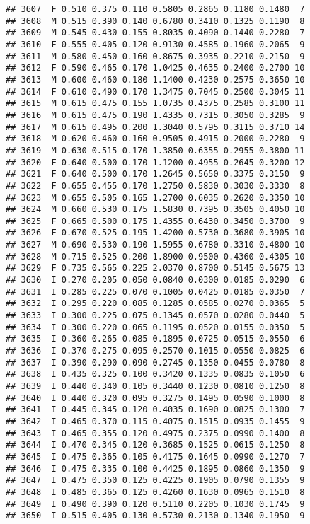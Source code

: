 \documentclass[
]{article}
\begin{document}
\begin{verbatim}
## 3607  F 0.510 0.375 0.110 0.5805 0.2865 0.1180 0.1480  7
## 3608  M 0.515 0.390 0.140 0.6780 0.3410 0.1325 0.1190  8
## 3609  M 0.545 0.430 0.155 0.8035 0.4090 0.1440 0.2280  7
## 3610  F 0.555 0.405 0.120 0.9130 0.4585 0.1960 0.2065  9
## 3611  M 0.580 0.450 0.160 0.8675 0.3935 0.2210 0.2150  9
## 3612  F 0.590 0.465 0.170 1.0425 0.4635 0.2400 0.2700 10
## 3613  M 0.600 0.460 0.180 1.1400 0.4230 0.2575 0.3650 10
## 3614  F 0.610 0.490 0.170 1.3475 0.7045 0.2500 0.3045 11
## 3615  M 0.615 0.475 0.155 1.0735 0.4375 0.2585 0.3100 11
## 3616  M 0.615 0.475 0.190 1.4335 0.7315 0.3050 0.3285  9
## 3617  M 0.615 0.495 0.200 1.3040 0.5795 0.3115 0.3710 14
## 3618  M 0.620 0.460 0.160 0.9505 0.4915 0.2000 0.2280  9
## 3619  M 0.630 0.515 0.170 1.3850 0.6355 0.2955 0.3800 11
## 3620  F 0.640 0.500 0.170 1.1200 0.4955 0.2645 0.3200 12
## 3621  F 0.640 0.500 0.170 1.2645 0.5650 0.3375 0.3150  9
## 3622  F 0.655 0.455 0.170 1.2750 0.5830 0.3030 0.3330  8
## 3623  M 0.655 0.505 0.165 1.2700 0.6035 0.2620 0.3350 10
## 3624  M 0.660 0.530 0.175 1.5830 0.7395 0.3505 0.4050 10
## 3625  F 0.665 0.500 0.175 1.4355 0.6430 0.3450 0.3700  9
## 3626  F 0.670 0.525 0.195 1.4200 0.5730 0.3680 0.3905 10
## 3627  M 0.690 0.530 0.190 1.5955 0.6780 0.3310 0.4800 10
## 3628  M 0.715 0.525 0.200 1.8900 0.9500 0.4360 0.4305 10
## 3629  F 0.735 0.565 0.225 2.0370 0.8700 0.5145 0.5675 13
## 3630  I 0.270 0.205 0.050 0.0840 0.0300 0.0185 0.0290  6
## 3631  I 0.285 0.225 0.070 0.1005 0.0425 0.0185 0.0350  7
## 3632  I 0.295 0.220 0.085 0.1285 0.0585 0.0270 0.0365  5
## 3633  I 0.300 0.225 0.075 0.1345 0.0570 0.0280 0.0440  5
## 3634  I 0.300 0.220 0.065 0.1195 0.0520 0.0155 0.0350  5
## 3635  I 0.360 0.265 0.085 0.1895 0.0725 0.0515 0.0550  6
## 3636  I 0.370 0.275 0.095 0.2570 0.1015 0.0550 0.0825  6
## 3637  I 0.390 0.290 0.090 0.2745 0.1350 0.0455 0.0780  8
## 3638  I 0.435 0.325 0.100 0.3420 0.1335 0.0835 0.1050  6
## 3639  I 0.440 0.340 0.105 0.3440 0.1230 0.0810 0.1250  8
## 3640  I 0.440 0.320 0.095 0.3275 0.1495 0.0590 0.1000  8
## 3641  I 0.445 0.345 0.120 0.4035 0.1690 0.0825 0.1300  7
## 3642  I 0.465 0.370 0.115 0.4075 0.1515 0.0935 0.1455  9
## 3643  I 0.465 0.355 0.120 0.4975 0.2375 0.0990 0.1400  8
## 3644  I 0.470 0.345 0.120 0.3685 0.1525 0.0615 0.1250  8
## 3645  I 0.475 0.365 0.105 0.4175 0.1645 0.0990 0.1270  7
## 3646  I 0.475 0.335 0.100 0.4425 0.1895 0.0860 0.1350  9
## 3647  I 0.475 0.350 0.125 0.4225 0.1905 0.0790 0.1355  9
## 3648  I 0.485 0.365 0.125 0.4260 0.1630 0.0965 0.1510  8
## 3649  I 0.490 0.390 0.120 0.5110 0.2205 0.1030 0.1745  9
## 3650  I 0.515 0.405 0.130 0.5730 0.2130 0.1340 0.1950  9

\end{verbatim}
\end{document}
